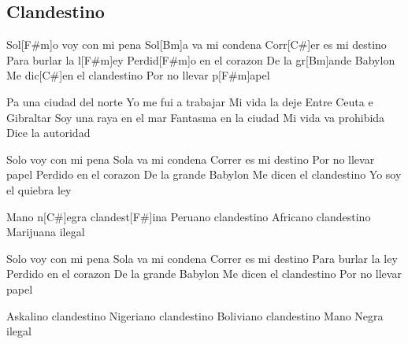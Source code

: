 \subsection*{Clandestino   }
\begin{guitar}
Sol[F#m]o voy con mi pena
Sol[Bm]a va mi condena
Corr[C#]er es mi destino
Para burlar la l[F#m]ey
Perdid[F#m]o en el corazon
De la gr[Bm]ande Babylon
Me dic[C#]en el clandestino
Por no llevar p[F#m]apel



Pa una ciudad del norte
Yo me fui a trabajar
Mi vida la deje
Entre Ceuta e Gibraltar
Soy una raya en el mar
Fantasma en la ciudad
Mi vida va prohibida
Dice la autoridad



Solo voy con mi pena
Sola va mi condena
Correr es mi destino
Por no llevar papel
Perdido en el corazon
De la grande Babylon
Me dicen el clandestino
Yo soy el quiebra ley



Mano n[C#]egra clandest[F#]ina
Peruano clandestino
Africano clandestino
Marijuana ilegal



Solo voy con mi pena
Sola va mi condena
Correr es mi destino
Para burlar la ley
Perdido en el corazon
De la grande Babylon
Me dicen el clandestino
Por no llevar papel



Askalino clandestino
Nigeriano clandestino
Boliviano clandestino
Mano Negra ilegal
\end{guitar}
